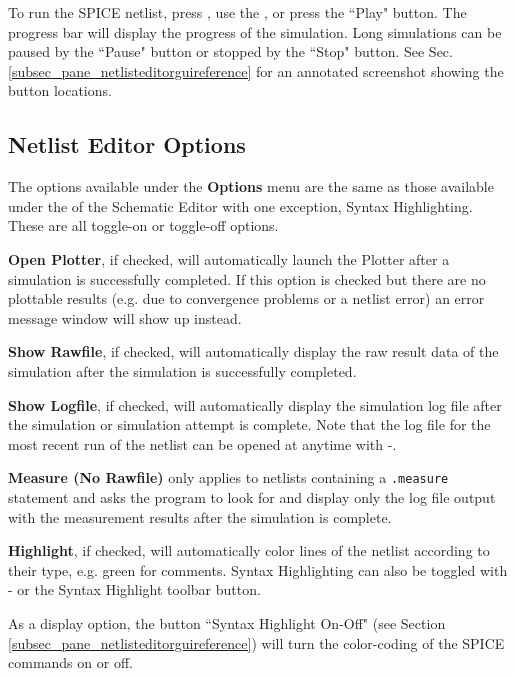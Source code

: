 To run the SPICE netlist, press , use the , or press the ``Play" button.  The progress bar will display the progress of the simulation.  Long simulations can be paused by the ``Pause" button or stopped by the ``Stop" button.  See Sec. \ref{subsec_pane_netlisteditorguireference} for an annotated screenshot showing the button locations.

\subsection{Netlist Editor Options}
\label{subsec_pane_netlisteditoroptions}

The options available under the \textsf{\textbf{Options}} menu are the same as those available under the  of the Schematic Editor with one exception, Syntax Highlighting. These are all toggle-on or toggle-off options.  

\textsf{\textbf{Open Plotter}}, if checked, will automatically launch the Plotter after a simulation is successfully completed.  If this option is checked but there are no plottable results (e.g. due to convergence problems or a netlist error) an error message window will show up instead.

\textsf{\textbf{Show Rawfile}}, if checked, will automatically display the raw result data of the simulation after the simulation is successfully completed.

\textsf{\textbf{Show Logfile}}, if checked, will automatically display the simulation log file after the simulation or simulation attempt is complete. Note that the log file for the most recent run of the netlist can be opened at anytime with -.

\textsf{\textbf{Measure (No Rawfile)}} only applies to netlists containing a \texttt{.measure} statement and asks the program to look for and display only the log file output with the measurement results after the simulation is complete.

\textsf{\textbf{Highlight}}, if checked, will automatically color lines of the netlist according to their type, e.g. green for comments. Syntax Highlighting can also be toggled with - or the Syntax Highlight toolbar button.

As a display option, the button ``Syntax Highlight On-Off" (see Section \ref{subsec_pane_netlisteditorguireference}) will turn the color-coding of the SPICE commands on or off.

